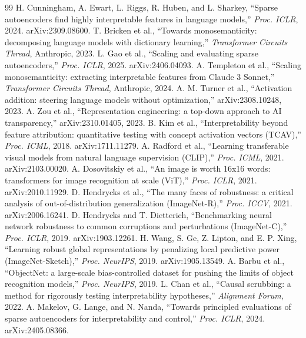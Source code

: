\documentclass[conference]{IEEEtran}
\begin{document}
\begin{thebibliography}{99}
 H. Cunningham, A. Ewart, L. Riggs, R. Huben, and L. Sharkey, ``Sparse autoencoders find highly interpretable features in language models,'' \textit{Proc. ICLR}, 2024. arXiv:2309.08600.
 T. Bricken et al., ``Towards monosemanticity: decomposing language models with dictionary learning,'' \textit{Transformer Circuits Thread}, Anthropic, 2023.
 L. Gao et al., ``Scaling and evaluating sparse autoencoders,'' \textit{Proc. ICLR}, 2025. arXiv:2406.04093.
 A. Templeton et al., ``Scaling monosemanticity: extracting interpretable features from Claude 3 Sonnet,'' \textit{Transformer Circuits Thread}, Anthropic, 2024.
 A. M. Turner et al., ``Activation addition: steering language models without optimization,'' arXiv:2308.10248, 2023.
 A. Zou et al., ``Representation engineering: a top-down approach to AI transparency,'' arXiv:2310.01405, 2023.
 B. Kim et al., ``Interpretability beyond feature attribution: quantitative testing with concept activation vectors (TCAV),'' \textit{Proc. ICML}, 2018. arXiv:1711.11279.
 A. Radford et al., ``Learning transferable visual models from natural language supervision (CLIP),'' \textit{Proc. ICML}, 2021. arXiv:2103.00020.
 A. Dosovitskiy et al., ``An image is worth 16x16 words: transformers for image recognition at scale (ViT),'' \textit{Proc. ICLR}, 2021. arXiv:2010.11929.
 D. Hendrycks et al., ``The many faces of robustness: a critical analysis of out-of-distribution generalization (ImageNet-R),'' \textit{Proc. ICCV}, 2021. arXiv:2006.16241.
 D. Hendrycks and T. Dietterich, ``Benchmarking neural network robustness to common corruptions and perturbations (ImageNet-C),'' \textit{Proc. ICLR}, 2019. arXiv:1903.12261.
 H. Wang, S. Ge, Z. Lipton, and E. P. Xing, ``Learning robust global representations by penalizing local predictive power (ImageNet-Sketch),'' \textit{Proc. NeurIPS}, 2019. arXiv:1905.13549.
 A. Barbu et al., ``ObjectNet: a large-scale bias-controlled dataset for pushing the limits of object recognition models,'' \textit{Proc. NeurIPS}, 2019.
 L. Chan et al., ``Causal scrubbing: a method for rigorously testing interpretability hypotheses,'' \textit{Alignment Forum}, 2022.
 A. Makelov, G. Lange, and N. Nanda, ``Towards principled evaluations of sparse autoencoders for interpretability and control,'' \textit{Proc. ICLR}, 2024. arXiv:2405.08366.

\end{thebibliography}
\end{document}
